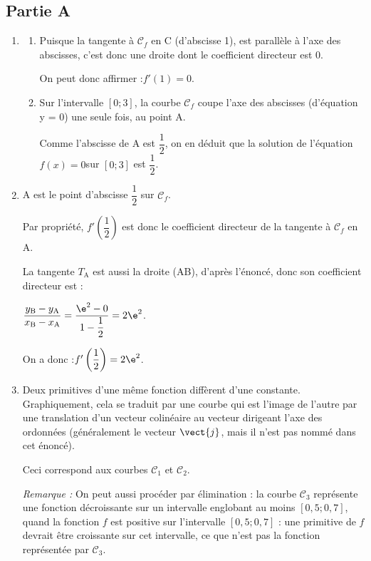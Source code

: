 \subsection*{Partie A}
	\begin{enumerate}
		\item \begin{enumerate}
			\item Puisque la tangente à $\mathcal{C}_f$ en C (d'abscisse 1), est parallèle à l'axe des abscisses, c'est donc une droite dont le coefficient directeur est 0.

			On peut donc affirmer :\quad $f'(1) = 0$.

			\item Sur l'intervalle $[0 ; 3]$, la courbe $\mathcal{C}_f$ coupe l'axe des abscisses (d'équation y = 0) une seule fois, au point A.

			Comme l'abscisse de A est $\dfrac{1}{2}$, on en déduit que la solution de l'équation \quad $f(x) = 0$\quad sur $[0 ; 3]$ est $\dfrac{1}{2}$.
		\end{enumerate}

		\item A est le point d'abscisse $\dfrac{1}{2}$ sur $\mathcal{C}_f$.

		Par propriété, $f'\left(\dfrac{1}{2}\right)$ est donc le coefficient directeur de la tangente à $\mathcal{C}_f$ en A.

		La tangente $T_{\mathrm{A}}$ est aussi la droite (AB), d'après l'énoncé, donc son coefficient directeur est :

		$\dfrac{y_{\mathrm{B}} - y_{\mathrm{A}}}{x_{\mathrm{B}}-x_{\mathrm{A}}} = \dfrac{\e^2 - 0}{1 - \dfrac{1}{2}} = 2\e^2$.

		On a donc :\quad $f'\left(\dfrac{1}{2}\right) = 2\e^2$.

		\item Deux primitives d'une même fonction diffèrent d'une constante. Graphiquement, cela se traduit par une courbe qui est l'image de l'autre par une translation d'un vecteur colinéaire au vecteur dirigeant l'axe des ordonnées (généralement le vecteur $\vect{j}$, mais il n'est pas nommé dans cet énoncé).

		Ceci correspond aux courbes $\mathcal{C}_1$ et $\mathcal{C_2}$.

		\emph{Remarque :} On peut aussi procéder par élimination : la courbe $\mathcal{C}_3$ représente une fonction décroissante sur un intervalle englobant au moins $[0,5 ; 0,7]$, quand la fonction $f$ est positive sur l'intervalle $[0,5 ; 0,7]$ : une primitive de $f$ devrait être croissante sur cet intervalle, ce que n'est pas la fonction représentée par $\mathcal{C}_3$.
	\end{enumerate}

